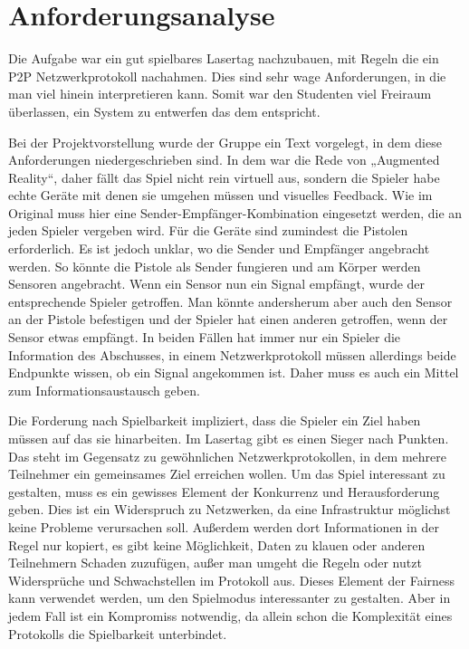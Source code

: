 \section{Anforderungsanalyse}
\label{sec:anforderungsanalyse}

Die Aufgabe war ein gut spielbares Lasertag nachzubauen, mit Regeln die ein
P2P Netzwerkprotokoll nachahmen. Dies sind sehr wage Anforderungen, in die man
viel hinein interpretieren kann. Somit war den Studenten viel Freiraum
überlassen, ein System zu entwerfen das dem entspricht.

Bei der Projektvorstellung wurde der Gruppe ein Text vorgelegt, in dem diese
Anforderungen niedergeschrieben sind. In dem war die Rede von 
„Augmented Reality“, daher fällt das Spiel nicht rein virtuell aus, sondern
die Spieler habe echte Geräte mit denen sie umgehen müssen und visuelles
Feedback. Wie im Original muss hier eine Sender-Empfänger-Kombination
eingesetzt werden, die an jeden Spieler vergeben wird. Für die Geräte sind
zumindest die Pistolen erforderlich. Es ist jedoch unklar, wo die Sender und
Empfänger angebracht werden. So könnte die Pistole als Sender fungieren und
am Körper werden Sensoren angebracht. Wenn ein Sensor nun ein Signal empfängt,
wurde der entsprechende Spieler getroffen. Man könnte andersherum aber auch
den Sensor an der Pistole befestigen und der Spieler hat einen anderen
getroffen, wenn der Sensor etwas empfängt. In beiden Fällen hat immer nur ein
Spieler die Information des Abschusses, in einem Netzwerkprotokoll müssen
allerdings beide Endpunkte wissen, ob ein Signal angekommen ist. Daher muss
es auch ein Mittel zum Informationsaustausch geben.

Die Forderung nach Spielbarkeit impliziert, dass die Spieler ein Ziel haben
müssen auf das sie hinarbeiten. Im Lasertag gibt es einen Sieger nach Punkten.
Das steht im Gegensatz zu gewöhnlichen Netzwerkprotokollen, in dem mehrere
Teilnehmer ein gemeinsames Ziel erreichen wollen. Um das Spiel interessant zu
gestalten, muss es ein gewisses Element der Konkurrenz und Herausforderung geben.
Dies ist ein Widerspruch zu Netzwerken, da eine Infrastruktur möglichst
keine Probleme verursachen soll. Außerdem werden dort
Informationen in der Regel nur kopiert, es gibt keine Möglichkeit, Daten zu
klauen oder anderen Teilnehmern Schaden zuzufügen, außer man umgeht die Regeln
oder nutzt Widersprüche und Schwachstellen im Protokoll aus.
Dieses Element der Fairness kann verwendet werden, um den Spielmodus
interessanter zu gestalten. Aber in jedem Fall ist ein Kompromiss notwendig,
da allein schon die Komplexität eines Protokolls die Spielbarkeit unterbindet.


